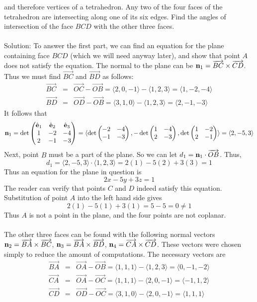 \documentclass[12pt]{amsbook}
\newcommand{\la}{\langle}
\newcommand{\ra}{\rangle}
\begin{document}
and therefore vertices of a tetrahedron. Any two of the four faces of the tetrahedron
are intersecting along one of its six edges. Find the angles of intersection
of the face $BCD$ with the other three faces.\\
\\
{\sc Solution}: To answer the first part, we can find an equation for the plane containing face $BCD$ (which we will need anyway later), and show that point $A$ does not satisfy the equation. The normal to the plane can be ${\bf n}_1=\overrightarrow{BC}\times \overrightarrow{CD}$. Thus we must find $\overrightarrow{BC}$ and $\overrightarrow{BD}$ as follows:
\begin{eqnarray*}
\overrightarrow{BC}&=&\overrightarrow{OC}-\overrightarrow{OB}=\la 2,0,-1\ra - \la 1,2,3 \ra = \la 1,-2,-4 \ra \\
\overrightarrow{BD}&=&\overrightarrow{OD}-\overrightarrow{OB}=\la 3,1,0\ra - \la 1,2,3 \ra = \la 2,-1,-3 \ra 
\end{eqnarray*}
It follows that
$${\bf n}_1=\det
\begin{pmatrix}
\hat{\bf e}_1 & \hat{\bf e}_2 & \hat{\bf e}_3\cr 1&-2&-4\cr 2&-1&-3 \end{pmatrix}=\la \det\begin{pmatrix}-2&-4\cr -1&-3  \end{pmatrix}, -\det\begin{pmatrix}1&-4\cr 2&-3  \end{pmatrix}, \det\begin{pmatrix}1&-2\cr 2&-1 \end{pmatrix} \ra = \la 2,-5,3 \ra$$
Next, point $B$ must be a part of the plane. So we can let $d_1={\bf n}_1\cdot\overrightarrow{OB}$. Thus,
$$d_1=\la 2,-5,3\ra \cdot \la 1,2,3 \ra = 2(1)-5(2)+3(3)=1$$
Thus an equation for the plane in question is
$$2x-5y+3z=1$$
The reader can verify that points $C$ and $D$ indeed satisfy this equation.
\\
Substitution of point $A$ into the left hand side gives
$$2(1)-5(1)+3(1)=5-5=0 \neq 1$$
Thus $A$ is not a point in the plane, and the four points are not coplanar.
\\
\\
The other three faces can be found with the following normal vectors ${\bf n}_2=\overrightarrow{BA}\times\overrightarrow{BC}$, ${\bf n}_3=\overrightarrow{BA}\times\overrightarrow{BD}$, ${\bf n}_4=\overrightarrow{CA}\times\overrightarrow{CD}$. These vectors were chosen simply to reduce the amount of computations. The necessary vectors are
\begin{eqnarray*}
\overrightarrow{BA}&=&\overrightarrow{OA}-\overrightarrow{OB}=\la 1,1,1 \ra - \la 1,2,3 \ra = \la 0,-1,-2 \ra \\
\overrightarrow{CA}&=&\overrightarrow{OA}-\overrightarrow{OC}=\la 1,1,1 \ra - \la 2,0,-1 \ra = \la -1, 1, 2 \ra \\
\overrightarrow{CD}&=&\overrightarrow{OD}-\overrightarrow{OC}=\la 3,1,0 \ra - \la 2,0,-1 \ra = \la 1, 1, 1 \ra
\end{eqnarray*} 
\end{document}
